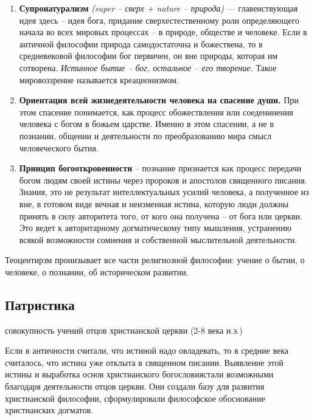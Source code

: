 \documentclass[
]{article}
\providecommand{\tightlist}{%
  \setlength{\itemsep}{0pt}\setlength{\parskip}{0pt}}
\begin{document}
\begin{enumerate}
\def\labelenumi{\arabic{enumi}.}
\item
  \textbf{Супронатурализм} \emph{(super -- сверх + nature -- природа)}
  --- главенствующая идея здесь -- идея бога, придание
  сверхестественному роли определяющего начала во всех мировых процессах
  -- в природе, обществе и человеке. Если в античной философии природа
  самодостаточна и божествена, то в средневековой философии бог
  первичен, он вне природы, которая им сотворена. \emph{Истинное бытие
  -- бог, остальное -- его творение.} Такое мировоззрение называется
  креационизмом.
\item
  \textbf{Ориентация всей жизнедеятельности человека на спасение души.}
  При этом спасение понимается, как процесс обожествления или
  соеденинения человека с богом в божьем царстве. Именно в этом
  спасении, а не в познании, общении и деятельности по преобразованию
  мира смысл человеческого бытия.
\item
  \textbf{Принцип богооткровенности} -- познание признается как процесс
  передачи богом людям своей истины через пророков и апостолов
  священного писания. Знания, это не результат интеллектуальных усилий
  человека, а полученное из вне, в готовом виде вечная и неизменная
  истина, которую люди должны принять в силу авторитета того, от кого
  она получена -- от бога или церкви. Это ведет к авторитарному
  догматическому типу мышления, устранению всякой возможности сомнения и
  собственной мыслительной деятельности.
\end{enumerate}

Теоцентирзм пронизывает все части религиозной философии: учение о бытии,
о человеке, о познании, об историческом развитии.

\hypertarget{ux43fux430ux442ux440ux438ux441ux442ux438ux43aux430}{%
\subsection{Патристика}\label{ux43fux430ux442ux440ux438ux441ux442ux438ux43aux430}}

\begin{description}
\tightlist
\item[\emph{\textbf{Патристика ---} (от слова patr -- отец)}]
совокупность учений отцов христианской церкви (2-8 века н.э.)
\end{description}

Если в античности считали, что истиной надо овладевать, то в средние
века считалось, что истина уже отклыта в священном писании. Выявление
этой истины и выработка основ христианского богословиястали возможными
благодаря деятельности отцов церкви. Они создали базу для развития
христианской философии, сформулировали философское обоснование
христианских догматов.
\end{document}
